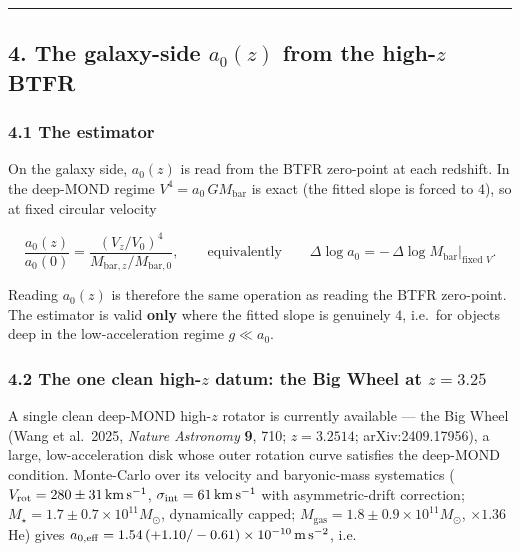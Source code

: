 \documentclass[
]{article}
\begin{document}
\begin{center}\rule{0.5\linewidth}{0.5pt}\end{center}

\subsection{\texorpdfstring{4. The galaxy-side \(a_0(z)\) from the
high-\(z\)
BTFR}{4. The galaxy-side a\_0(z) from the high-z BTFR}}\label{the-galaxy-side-a_0z-from-the-high-z-btfr}

\subsubsection{4.1 The estimator}\label{the-estimator}

On the galaxy side, \(a_0(z)\) is read from the BTFR zero-point at each
redshift. In the deep-MOND regime \(V^4=a_0\,GM_\mathrm{bar}\) is exact
(the fitted slope is forced to \(4\)), so at fixed circular velocity

\[\frac{a_0(z)}{a_0(0)}=\frac{(V_z/V_0)^4}{M_{\mathrm{bar},z}/M_{\mathrm{bar},0}},\qquad\text{equivalently}\qquad \Delta\log a_0=-\,\Delta\log M_\mathrm{bar}\big|_{\text{fixed }V}.\]

Reading \(a_0(z)\) is therefore the same operation as reading the BTFR
zero-point. The estimator is valid \textbf{only} where the fitted slope
is genuinely \(4\), i.e.~for objects deep in the low-acceleration regime
\(g\ll a_0\).

\subsubsection{\texorpdfstring{4.2 The one clean high-\(z\) datum: the
Big Wheel at
\(z=3.25\)}{4.2 The one clean high-z datum: the Big Wheel at z=3.25}}\label{the-one-clean-high-z-datum-the-big-wheel-at-z3.25}

A single clean deep-MOND high-\(z\) rotator is currently available ---
the Big Wheel (Wang et al.~2025, \emph{Nature Astronomy} \textbf{9},
710; \(z=3.2514\); arXiv:2409.17956), a large, low-acceleration disk
whose outer rotation curve satisfies the deep-MOND condition.
Monte-Carlo over its velocity and baryonic-mass systematics
(\(V_\mathrm{rot}=280\pm31\,{\rm km\,s^{-1}}\),
\(\sigma_\mathrm{int}=61\,{\rm km\,s^{-1}}\) with asymmetric-drift
correction; \(M_\star=1.7\pm0.7\times10^{11}M_\odot\), dynamically
capped; \(M_\mathrm{gas}=1.8\pm0.9\times10^{11}M_\odot\), \(\times1.36\)
He) gives
\(a_{0,\rm eff}=1.54\,(+1.10/-0.61)\times10^{-10}\,{\rm m\,s^{-2}}\),
i.e.
\end{document}
